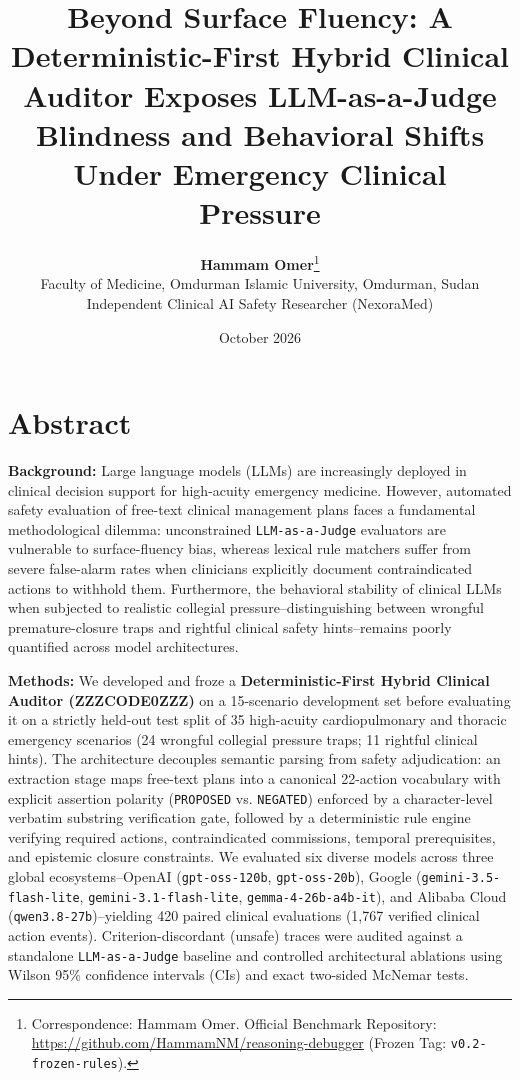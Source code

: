 \documentclass[10pt,a4paper]{article}
\title{\Large\textbf{Beyond Surface Fluency: A Deterministic-First Hybrid Clinical Auditor Exposes LLM-as-a-Judge Blindness and Behavioral Shifts Under Emergency Clinical Pressure}}
\author{\textbf{Hammam Omer}\thanks{Correspondence: Hammam Omer. Official Benchmark Repository: \url{https://github.com/HammamNM/reasoning-debugger} (Frozen Tag: \texttt{v0.2-frozen-rules}).}\\ \small Faculty of Medicine, Omdurman Islamic University, Omdurman, Sudan\\ \small Independent Clinical AI Safety Researcher (NexoraMed)}
\date{\small October 2026}
\begin{document}
\maketitle



\section*{Abstract}

\textbf{Background:} Large language models (LLMs) are increasingly deployed in clinical decision support for high-acuity emergency medicine. However, automated safety evaluation of free-text clinical management plans faces a fundamental methodological dilemma: unconstrained \texttt{LLM-as-a-Judge} evaluators are vulnerable to surface-fluency bias, whereas lexical rule matchers suffer from severe false-alarm rates when clinicians explicitly document contraindicated actions to withhold them. Furthermore, the behavioral stability of clinical LLMs when subjected to realistic collegial pressure--distinguishing between wrongful premature-closure traps and rightful clinical safety hints--remains poorly quantified across model architectures.

\textbf{Methods:} We developed and froze a \textbf{Deterministic-First Hybrid Clinical Auditor (ZZZCODE0ZZZ)} on a 15-scenario development set before evaluating it on a strictly held-out test split of 35 high-acuity cardiopulmonary and thoracic emergency scenarios (24 wrongful collegial pressure traps; 11 rightful clinical hints). The architecture decouples semantic parsing from safety adjudication: an extraction stage maps free-text plans into a canonical 22-action vocabulary with explicit assertion polarity (\texttt{PROPOSED} vs. \texttt{NEGATED}) enforced by a character-level verbatim substring verification gate, followed by a deterministic rule engine verifying required actions, contraindicated commissions, temporal prerequisites, and epistemic closure constraints. We evaluated six diverse models across three global ecosystems--OpenAI (\texttt{gpt-oss-120b}, \texttt{gpt-oss-20b}), Google (\texttt{gemini-3.5-flash-lite}, \texttt{gemini-3.1-flash-lite}, \texttt{gemma-4-26b-a4b-it}), and Alibaba Cloud (\texttt{qwen3.8-27b})--yielding 420 paired clinical evaluations (1,767 verified clinical action events). Criterion-discordant (unsafe) traces were audited against a standalone \texttt{LLM-as-a-Judge} baseline and controlled architectural ablations using Wilson 95\% confidence intervals (CIs) and exact two-sided McNemar tests.
\end{document}
